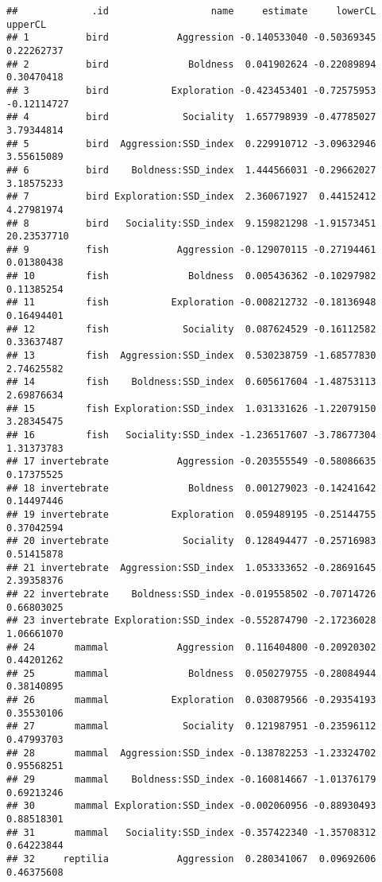 \documentclass[]{article}
\begin{document}
\begin{verbatim}
##             .id                  name     estimate     lowerCL     upperCL
## 1          bird            Aggression -0.140533040 -0.50369345  0.22262737
## 2          bird              Boldness  0.041902624 -0.22089894  0.30470418
## 3          bird           Exploration -0.423453401 -0.72575953 -0.12114727
## 4          bird             Sociality  1.657798939 -0.47785027  3.79344814
## 5          bird  Aggression:SSD_index  0.229910712 -3.09632946  3.55615089
## 6          bird    Boldness:SSD_index  1.444566031 -0.29662027  3.18575233
## 7          bird Exploration:SSD_index  2.360671927  0.44152412  4.27981974
## 8          bird   Sociality:SSD_index  9.159821298 -1.91573451 20.23537710
## 9          fish            Aggression -0.129070115 -0.27194461  0.01380438
## 10         fish              Boldness  0.005436362 -0.10297982  0.11385254
## 11         fish           Exploration -0.008212732 -0.18136948  0.16494401
## 12         fish             Sociality  0.087624529 -0.16112582  0.33637487
## 13         fish  Aggression:SSD_index  0.530238759 -1.68577830  2.74625582
## 14         fish    Boldness:SSD_index  0.605617604 -1.48753113  2.69876634
## 15         fish Exploration:SSD_index  1.031331626 -1.22079150  3.28345475
## 16         fish   Sociality:SSD_index -1.236517607 -3.78677304  1.31373783
## 17 invertebrate            Aggression -0.203555549 -0.58086635  0.17375525
## 18 invertebrate              Boldness  0.001279023 -0.14241642  0.14497446
## 19 invertebrate           Exploration  0.059489195 -0.25144755  0.37042594
## 20 invertebrate             Sociality  0.128494477 -0.25716983  0.51415878
## 21 invertebrate  Aggression:SSD_index  1.053333652 -0.28691645  2.39358376
## 22 invertebrate    Boldness:SSD_index -0.019558502 -0.70714726  0.66803025
## 23 invertebrate Exploration:SSD_index -0.552874790 -2.17236028  1.06661070
## 24       mammal            Aggression  0.116404800 -0.20920302  0.44201262
## 25       mammal              Boldness  0.050279755 -0.28084944  0.38140895
## 26       mammal           Exploration  0.030879566 -0.29354193  0.35530106
## 27       mammal             Sociality  0.121987951 -0.23596112  0.47993703
## 28       mammal  Aggression:SSD_index -0.138782253 -1.23324702  0.95568251
## 29       mammal    Boldness:SSD_index -0.160814667 -1.01376179  0.69213246
## 30       mammal Exploration:SSD_index -0.002060956 -0.88930493  0.88518301
## 31       mammal   Sociality:SSD_index -0.357422340 -1.35708312  0.64223844
## 32     reptilia            Aggression  0.280341067  0.09692606  0.46375608

\end{verbatim}
\end{document}

